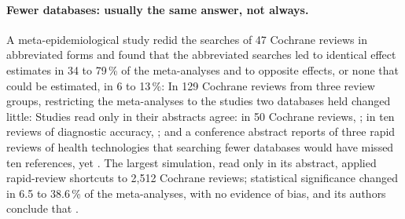 \paragraph{Fewer databases: usually the same answer, not always.}
A meta-\hspace{0pt}epidemiological study redid the searches of 47 Cochrane reviews in
abbreviated forms and found that the abbreviated searches led to
identical effect estimates in 34 to 79\,\% of the meta-analyses and to
opposite effects, or none that could be estimated, in 6 to 13\,\%:
In 129 Cochrane reviews from three review groups, restricting the
meta-analyses to the studies two databases held changed little:
Studies read only in their abstracts agree: in 50 Cochrane reviews,
; in ten reviews of diagnostic accuracy,
; and a conference abstract reports of
three rapid reviews of health technologies that searching fewer databases
would have missed ten references, yet
.
The largest simulation, read only in its abstract, applied rapid-review
shortcuts to 2,512 Cochrane reviews; statistical significance changed in
6.5 to 38.6\,\% of the meta-analyses, with no evidence of bias, and its
authors conclude that .

